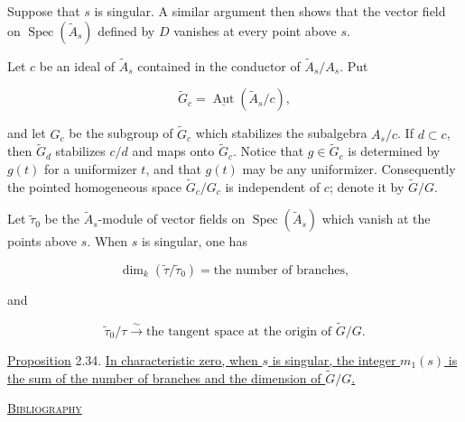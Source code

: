 Suppose that $s$ is singular.  A similar argument then shows that the vector
field on $\operatorname{Spec}(\widetilde A_s)$ defined by $D$ vanishes at every
point above $s$.

Let $c$ be an ideal of $\widetilde A_s$ contained in the conductor of
$\widetilde A_s/A_s$.  Put

\begin{equation*}
\widetilde G_c=\underline{\operatorname{Aut}}(\widetilde A_s/c),
\end{equation*}

and let $G_c$ be the subgroup of $\widetilde G_c$ which stabilizes the
subalgebra $A_s/c$.  If $d\subset c$, then $\widetilde G_d$ stabilizes $c/d$
and maps onto $\widetilde G_c$.  Notice that
$g\in\widetilde G_c$ is determined by $g(t)$ for a uniformizer $t$, and that
$g(t)$ may be any uniformizer.  Consequently the pointed homogeneous space
$\widetilde G_c/G_c$ is independent of $c$; denote it by $\widetilde G/G$.

Let $\widetilde\tau_0$ be the $\widetilde A_s$-module of vector fields on
$\operatorname{Spec}(\widetilde A_s)$ which vanish at the points above $s$.
When $s$ is singular, one has

\begin{equation*}
\dim_k(\widetilde\tau/\widetilde\tau_0)
=\text{the number of branches},
\end{equation*}

and

\begin{equation*}
\widetilde\tau_0/\tau\overset\sim\longrightarrow
\text{the tangent space at the origin of }\widetilde G/G.
\end{equation*}


\underline{Proposition} 2.34. \underline{In characteristic zero, when $s$ is
singular, the integer $m_1(s)$ is the sum of the number of branches and the
dimension of $\widetilde G/G$.}

\bigskip
\begin{center}
\underline{\textsc{Bibliography}}
\end{center}

